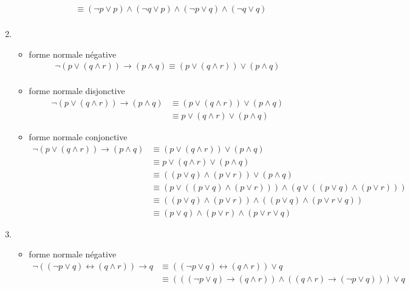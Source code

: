 \documentclass[12pt]{report}
\begin{document}
\begin{enumerate}
\begin{itemize}
\begin{align*}
                    & \equiv (\neg p \vee p) \wedge (\neg q \vee p) \wedge (\neg p \vee q) \wedge (\neg q \vee q)\\
                \end{align*}
        \end{itemize}
  \item \begin{itemize}
      \item  forme normale négative
        \begin{align*}
        \neg (p \vee (q \wedge r)) \to (p \wedge q) \equiv (p \vee (q \wedge r)) \vee (p \wedge q) \\
        \end{align*}
      \item  forme normale disjonctive
          \begin{align*}
          \neg (p \vee (q \wedge r)) \to (p \wedge q) & \equiv (p \vee (q \wedge r)) \vee (p \wedge q)\\
          & \equiv p \vee (q \wedge r) \vee (p \wedge q)
          \end{align*}
      \item forme normale conjonctive
        \begin{align*}
          \neg (p \vee (q \wedge r)) \to (p \wedge q) & \equiv (p \vee (q \wedge r)) \vee (p \wedge q)\\
          & \equiv p \vee (q \wedge r) \vee (p \wedge q)\\
          & \equiv ((p \vee q) \wedge (p \vee r)) \vee (p \wedge q) \\
          & \equiv (p \vee ((p \vee q) \wedge (p \vee r))) \wedge (q \vee ((p \vee q) \wedge (p \vee r)))\\
          & \equiv ((p \vee q) \wedge (p \vee r)) \wedge ((p \vee q) \wedge (p \vee r \vee q))\\
          & \equiv (p \vee q) \wedge (p \vee r) \wedge (p \vee r \vee q)
        \end{align*}
      \end{itemize}
  \item \begin{itemize}
      \item  forme normale négative
        \begin{align*}
          \neg ((\neg p \vee q) \leftrightarrow (q \wedge r)) \to q  & \equiv ((\neg p \vee q) \leftrightarrow (q \wedge r)) \vee q  \\
          & \equiv (((\neg p \vee q) \to (q \wedge r)) \wedge ((q \wedge r) \to (\neg p \vee q))) \vee q\\

\end{align*}
\end{itemize}
\end{enumerate}
\end{document}
